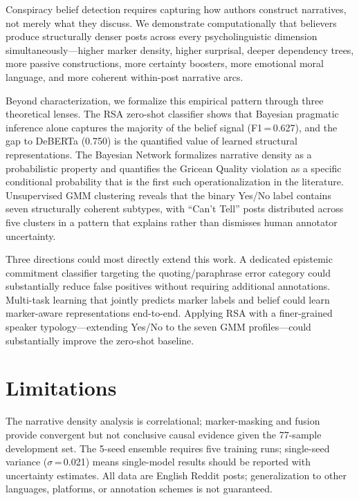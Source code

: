 \documentclass[11pt]{article}
\begin{document}
Conspiracy belief detection requires capturing how authors construct
narratives, not merely what they discuss.
We demonstrate computationally that believers produce structurally denser
posts across every psycholinguistic dimension simultaneously---higher
marker density, higher surprisal, deeper dependency trees, more passive
constructions, more certainty boosters, more emotional moral language,
and more coherent within-post narrative arcs.

Beyond characterization, we formalize this empirical pattern through
three theoretical lenses.
The RSA zero-shot classifier shows that Bayesian pragmatic inference
alone captures the majority of the belief signal (F1\,=\,0.627), and the
gap to DeBERTa (0.750) is the quantified value of learned structural
representations.
The Bayesian Network formalizes narrative density as a probabilistic
property and quantifies the Gricean Quality violation as a specific
conditional probability that is the first such operationalization in the
literature.
Unsupervised GMM clustering reveals that the binary Yes/No label contains
seven structurally coherent subtypes, with ``Can't Tell'' posts distributed
across five clusters in a pattern that explains rather than dismisses
human annotator uncertainty.

Three directions could most directly extend this work.
A dedicated epistemic commitment classifier targeting the
quoting/paraphrase error category could substantially reduce false
positives without requiring additional annotations.
Multi-task learning that jointly predicts marker labels and belief could
learn marker-aware representations end-to-end.
Applying RSA with a finer-grained speaker typology---extending Yes/No
to the seven GMM profiles---could substantially improve the zero-shot
baseline.

\section*{Limitations}

The narrative density analysis is correlational; marker-masking and
fusion provide convergent but not conclusive causal evidence given the
77-sample development set.
The 5-seed ensemble requires five training runs; single-seed variance
($\sigma$\,=\,0.021) means single-model results should be reported with
uncertainty estimates.
All data are English Reddit posts; generalization to other languages,
platforms, or annotation schemes is not guaranteed.
\end{document}
